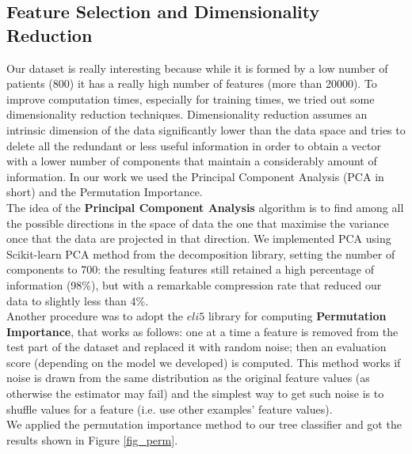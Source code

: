 \documentclass[12pt]{article}
\begin{document}
\subsection{Feature Selection and Dimensionality Reduction}
Our dataset is really interesting because while it is formed by a low number of patients (800) it has a really high number of features (more than 20000). To improve computation times, especially for training times, we tried out some dimensionality reduction techniques. Dimensionality reduction assumes an intrinsic dimension of the data significantly lower than the data space and tries to delete all the redundant or less useful information in order to obtain a vector with a lower number of components that maintain a considerably amount of information. In our work we used the Principal Component Analysis (PCA in short) and the Permutation Importance. \\
The idea of the \textbf{Principal Component Analysis} algorithm is to find among all the possible directions in the space of data the one that maximise the variance once that the data are projected in that direction. We implemented  PCA using Scikit-learn PCA method from the decomposition library, setting the number of components to 700: the resulting features still retained a high percentage of information (98\%), but with a remarkable compression rate that reduced our data to slightly less than 4\%. \\
Another procedure was to adopt the $eli5$ library for computing \textbf{Permutation Importance}, that works as follows:
one at a time a feature is removed from the test part of the dataset and replaced it with random noise; then an evaluation score (depending on the model we developed) is computed. This method works if noise is drawn from the same distribution as the original feature values (as otherwise the estimator may fail) and the simplest way to get such noise is to shuffle values for a feature (i.e. use other examples' feature values). \\
We applied the permutation importance method to our tree classifier and got the results shown in Figure \ref{fig_perm}. \\
\end{document}
